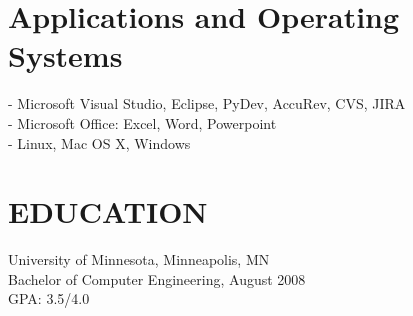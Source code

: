 \documentclass{res}
\begin{document}
\begin{resume}
\normalsize{\section{Applications and Operating Systems}}
\vspace{0.05in} 
		- Microsoft Visual Studio, Eclipse, PyDev, AccuRev, CVS, JIRA \\
		- Microsoft Office: Excel, Word, Powerpoint \\
    - Linux, Mac OS X, Windows 
		

\section{EDUCATION}
\vspace{0.05in}         
    University of Minnesota, Minneapolis, MN \\
		Bachelor of Computer Engineering, August 2008 \\
		GPA: 3.5/4.0           
		
\end{resume}
\end{document}

